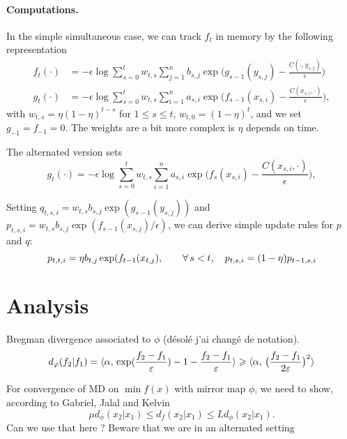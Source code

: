 \documentclass[a4paper, 10pt]{article}
\begin{document}
\paragraph{Computations.} In the simple simultaneous case, we can track $f_t$ in memory by the following representation
\begin{align}
    f_t(\cdot) &= - \epsilon \log \sum_{s=0}^t w_{t,s} \sum_{j=1}^n b_{s, j} 
    \exp\Big(g_{s-1}(y_{s,j}) - \frac{C(\cdot, y_{s, j})}{\epsilon}\Big) \\
    g_t(\cdot) &= - \epsilon \log \sum_{s=0}^t w_{t,s} \sum_{i=1}^n a_{s, i} 
    \exp\Big(f_{s-1}(x_{s, i}) - \frac{C(x_{s,i}, \cdot)}{\epsilon}\Big),
\end{align}
with $w_{t,s} = \eta (1-\eta)^{t-s}$ for $1 \leq s \leq t$, $w_{t,0} =
(1-\eta)^{t}$, and we set $g_{-1} = f_{-1} = 0$. The weights are a bit more
complex is $\eta$ depends on time.

The alternated version sets
\begin{equation}
    g_t(\cdot) = - \epsilon \log \sum_{s=0}^t w_{t,s} \sum_{i=1}^n a_{s, i} 
    \exp\Big(f_{s}(x_{s, i}) - \frac{C(x_{s,i}, \cdot)}{\epsilon}\Big),
\end{equation}

Setting $q_{t,s,i} = w_{t,s} b_{s, j} \exp(g_{s-1}(y_{s,
j}))$ and $p_{t,s,i} = w_{t,s} b_{s, j} \exp(f_{s-1}(x_{s, j})/ \epsilon)$, we can derive
simple update rules for $p$ and $q$:
\begin{equation}
    p_{t,t, i} = \eta b_{t,j} \exp(f_{t-1}(x_{t, j}),
    \qquad \forall \, s < t,\quad p_{t,s, i} = (1- \eta) p_{t-1,s, i}
\end{equation}


\section{Analysis}

Bregman divergence associated to $\phi$ (désolé j'ai changé de notation).
\begin{equation}
    d_{\varphi}(f_2|f_1) = \langle \alpha,\,\exp(\frac{f_2-f_1}{\varepsilon})
     - 1 - \frac{f_2-f_1}{\varepsilon}\rangle
      \geqslant \langle \alpha,\,\big(\frac{f_2-f_1}{2 \varepsilon}\big)^2\rangle
\end{equation}

For convergence of MD on $\min f(x)$ with mirror map $\phi$, we need to show, according to Gabriel, Jalal and Kelvin
\begin{equation}
    \mu d_\phi(x_2|x_1 )\leq d_f(x_2|x_1) \leq L d_\phi(x_2|x_1).
\end{equation}
Can we use that here ? Beware that we are in an alternated setting
\end{document}
